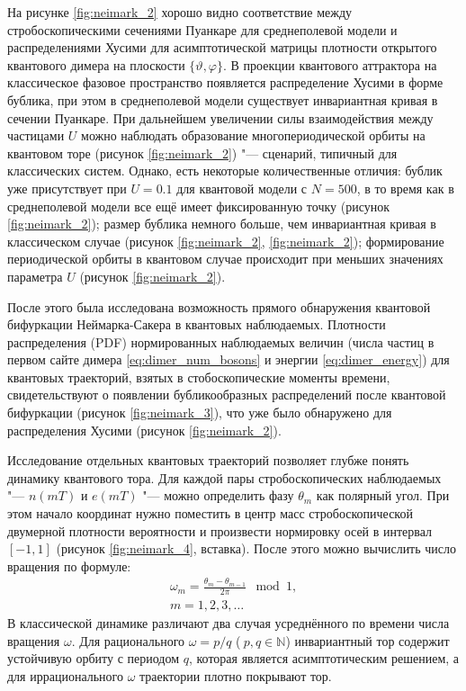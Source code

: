 На рисунке \cref{fig:neimark_2} хорошо видно соответствие между стробоскопическими сечениями Пуанкаре для среднеполевой модели и распределениями Хусими для асимптотической матрицы плотности открытого квантового димера на плоскости \(\{\vartheta,\varphi\}\).
В проекции квантового аттрактора на классическое фазовое пространство появляется распределение Хусими в форме бублика, при этом в среднеполевой модели существует инвариантная кривая в сечении Пуанкаре.
При дальнейшем увеличении силы взаимодействия между частицами \(U\) можно наблюдать образование многопериодической орбиты на квантовом торе (рисунок \cref{fig:neimark_2}) "--- сценарий, типичный для классических систем.
Однако, есть некоторые количественные отличия: бублик уже присутствует при \(U=0.1\) для квантовой модели с \(N = 500\), в то время как в среднеполевой модели все ещё имеет фиксированную точку (рисунок \cref{fig:neimark_2}); размер бублика немного больше, чем инвариантная кривая в классическом случае (рисунок \cref{fig:neimark_2}, \cref{fig:neimark_2}); формирование периодической орбиты в квантовом случае происходит при меньших значениях параметра \(U\) (рисунок \cref{fig:neimark_2}).

После этого была исследована возможность прямого обнаружения квантовой бифуркации Неймарка-Сакера в квантовых наблюдаемых. 
Плотности распределения (PDF) нормированных наблюдаемых величин (числа частиц в первом сайте димера \cref{eq:dimer_num_bosons} и энергии \cref{eq:dimer_energy}) для квантовых траекторий, взятых в стобоскопические моменты времени, свидетельствуют о появлении бубликообразных распределений после квантовой бифуркации (рисунок \cref{fig:neimark_3}), что уже было обнаружено для распределения Хусими (рисунок \cref{fig:neimark_2}).

Исследование отдельных квантовых траекторий позволяет глубже понять динамику квантового тора.
Для каждой пары стробоскопических наблюдаемых  "--- \(n(mT)\) и \(e(mT)\) "--- можно определить фазу \(\theta_m\) как полярный угол. 
При этом начало координат нужно поместить в центр масс стробоскопической двумерной плотности вероятности и произвести нормировку осей в интервал \(\left[-1, 1\right]\) (рисунок \cref{fig:neimark_4}, вставка).
После этого можно вычислить число вращения по формуле:
\begin{equation}
	\label{eq:neimark_rotation}
	\begin{gathered}
		\omega_m=\frac{\theta_m-\theta_{m-1}}{2\pi} \mod 1, \\
		m = 1, 2, 3, \ldots
	\end{gathered}
\end{equation}
В классической динамике различают два случая усреднённого по времени числа вращения $\omega$. 
Для рационального $\omega = p/q$ ($\ p,q \in \mathbb{N}$) инвариантный тор содержит устойчивую орбиту с периодом $q$, которая является асимптотическим решением, а для иррационального $\omega$ траектории плотно покрывают тор.

